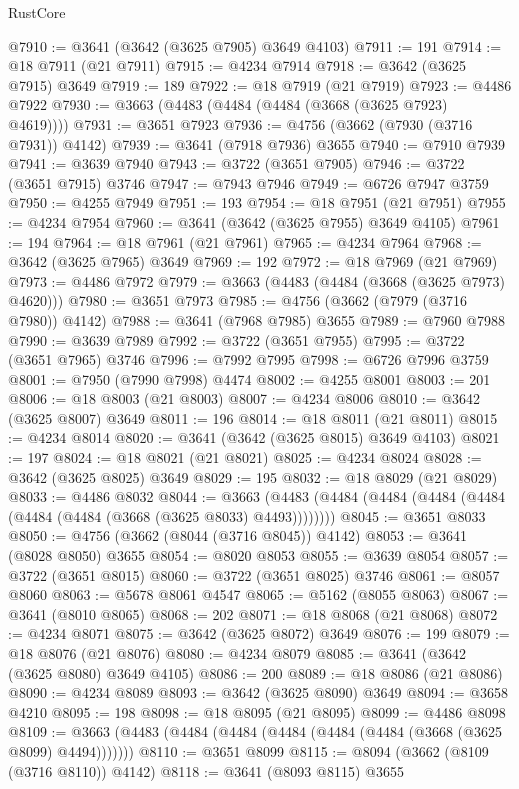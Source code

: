 \begin{lexlean}{RustCore}
\begin{coremodule}
@7910 := @3641 (@3642 (@3625 @7905) @3649 @4103)
@7911 := 191
@7914 := @18 @7911 (@21 @7911)
@7915 := @4234 @7914
@7918 := @3642 (@3625 @7915) @3649
@7919 := 189
@7922 := @18 @7919 (@21 @7919)
@7923 := @4486 @7922
@7930 := @3663 (@4483 (@4484 (@4484 (@3668 (@3625 @7923) @4619))))
@7931 := @3651 @7923
@7936 := @4756 (@3662 (@7930 (@3716 @7931)) @4142)
@7939 := @3641 (@7918 @7936) @3655
@7940 := @7910 @7939
@7941 := @3639 @7940
@7943 := @3722 (@3651 @7905)
@7946 := @3722 (@3651 @7915) @3746
@7947 := @7943 @7946
@7949 := @6726 @7947 @3759
@7950 := @4255 @7949
@7951 := 193
@7954 := @18 @7951 (@21 @7951)
@7955 := @4234 @7954
@7960 := @3641 (@3642 (@3625 @7955) @3649 @4105)
@7961 := 194
@7964 := @18 @7961 (@21 @7961)
@7965 := @4234 @7964
@7968 := @3642 (@3625 @7965) @3649
@7969 := 192
@7972 := @18 @7969 (@21 @7969)
@7973 := @4486 @7972
@7979 := @3663 (@4483 (@4484 (@3668 (@3625 @7973) @4620)))
@7980 := @3651 @7973
@7985 := @4756 (@3662 (@7979 (@3716 @7980)) @4142)
@7988 := @3641 (@7968 @7985) @3655
@7989 := @7960 @7988
@7990 := @3639 @7989
@7992 := @3722 (@3651 @7955)
@7995 := @3722 (@3651 @7965) @3746
@7996 := @7992 @7995
@7998 := @6726 @7996 @3759
@8001 := @7950 (@7990 @7998) @4474
@8002 := @4255 @8001
@8003 := 201
@8006 := @18 @8003 (@21 @8003)
@8007 := @4234 @8006
@8010 := @3642 (@3625 @8007) @3649
@8011 := 196
@8014 := @18 @8011 (@21 @8011)
@8015 := @4234 @8014
@8020 := @3641 (@3642 (@3625 @8015) @3649 @4103)
@8021 := 197
@8024 := @18 @8021 (@21 @8021)
@8025 := @4234 @8024
@8028 := @3642 (@3625 @8025) @3649
@8029 := 195
@8032 := @18 @8029 (@21 @8029)
@8033 := @4486 @8032
@8044 := @3663 (@4483 (@4484 (@4484 (@4484 (@4484 (@4484 (@4484 (@3668 (@3625 @8033) @4493))))))))
@8045 := @3651 @8033
@8050 := @4756 (@3662 (@8044 (@3716 @8045)) @4142)
@8053 := @3641 (@8028 @8050) @3655
@8054 := @8020 @8053
@8055 := @3639 @8054
@8057 := @3722 (@3651 @8015)
@8060 := @3722 (@3651 @8025) @3746
@8061 := @8057 @8060
@8063 := @5678 @8061 @4547
@8065 := @5162 (@8055 @8063)
@8067 := @3641 (@8010 @8065)
@8068 := 202
@8071 := @18 @8068 (@21 @8068)
@8072 := @4234 @8071
@8075 := @3642 (@3625 @8072) @3649
@8076 := 199
@8079 := @18 @8076 (@21 @8076)
@8080 := @4234 @8079
@8085 := @3641 (@3642 (@3625 @8080) @3649 @4105)
@8086 := 200
@8089 := @18 @8086 (@21 @8086)
@8090 := @4234 @8089
@8093 := @3642 (@3625 @8090) @3649
@8094 := @3658 @4210
@8095 := 198
@8098 := @18 @8095 (@21 @8095)
@8099 := @4486 @8098
@8109 := @3663 (@4483 (@4484 (@4484 (@4484 (@4484 (@4484 (@3668 (@3625 @8099) @4494)))))))
@8110 := @3651 @8099
@8115 := @8094 (@3662 (@8109 (@3716 @8110)) @4142)
@8118 := @3641 (@8093 @8115) @3655

\end{coremodule}
\end{lexlean}
